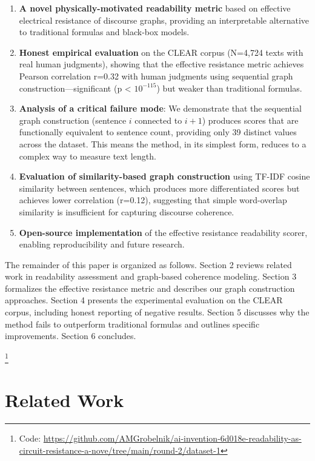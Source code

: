 \documentclass[11pt,letterpaper]{article}
\begin{document}
\begin{enumerate}
    \item \textbf{A novel physically-motivated readability metric} based on effective electrical resistance of discourse graphs, providing an interpretable alternative to traditional formulas and black-box models.
    
    \item \textbf{Honest empirical evaluation} on the CLEAR corpus (N=4,724 texts with real human judgments), showing that the effective resistance metric achieves Pearson correlation r=0.32 with human judgments using sequential graph construction---significant (p < $10^{-115}$) but weaker than traditional formulas.
    
    \item \textbf{Analysis of a critical failure mode}: We demonstrate that the sequential graph construction (sentence $i$ connected to $i+1$) produces scores that are functionally equivalent to sentence count, providing only 39 distinct values across the dataset. This means the method, in its simplest form, reduces to a complex way to measure text length.
    
    \item \textbf{Evaluation of similarity-based graph construction} using TF-IDF cosine similarity between sentences, which produces more differentiated scores but achieves lower correlation (r=0.12), suggesting that simple word-overlap similarity is insufficient for capturing discourse coherence.
    
    \item \textbf{Open-source implementation} of the effective resistance readability scorer, enabling reproducibility and future research.
\end{enumerate}

The remainder of this paper is organized as follows. Section 2 reviews related work in readability assessment and graph-based coherence modeling. Section 3 formalizes the effective resistance metric and describes our graph construction approaches. Section 4 presents the experimental evaluation on the CLEAR corpus, including honest reporting of negative results. Section 5 discusses why the method fails to outperform traditional formulas and outlines specific improvements. Section 6 concludes.

\footnote{Code: \url{https://github.com/AMGrobelnik/ai-invention-6d018e-readability-as-circuit-resistance-a-nove/tree/main/round-2/dataset-1}}

\section{Related Work}
\end{document}
